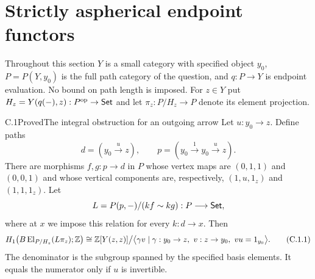 \section{Strictly aspherical endpoint functors}
\label{sec:C}

Throughout this section $Y$ is a small category with specified object
$y_0$, $P=P(Y,y_0)$ is the full path category of the question, and
$q:P\to Y$ is endpoint evaluation. No bound on path length is imposed.
For $z\in Y$ put $H_z=Y(q(-),z):P^{\mathrm{op}}\to\mathsf{Set}$ and let
$\pi_z:P/H_z\to P$ denote its element projection.

\begin{claim}{C.1}{Proved}{The integral obstruction for an outgoing arrow}
\label{C:outgoing}
Let $u:y_0\to z$. Define paths
\[
 d=(y_0\xrightarrow{u}z),\qquad
 p=(y_0\xrightarrow{1}y_0\xrightarrow{u}z).
\]
There are morphisms $f,g:p\to d$ in $P$ whose vertex maps are
$(0,1,1)$ and $(0,0,1)$ and whose vertical components are, respectively,
$(1,u,1_z)$ and $(1,1,1_z)$. Let
\[
 L=P(p,-)/(kf\sim kg):P\longrightarrow\mathsf{Set},
\]
where at $x$ we impose this relation for every $k:d\to x$. Then
\[
 H_1\bigl(B\operatorname{El}_{P/H_z}(L\pi_z);\mathbb Z\bigr)
 \cong \mathbb Z[Y(z,z)]\big/
 \big\langle\gamma v\mid
 \gamma:y_0\to z,\ v:z\to y_0,\ vu=1_{y_0}\big\rangle.
 \tag{C.1.1}\label{eq:C-outgoing}
\]
The denominator is the subgroup spanned by the specified basis elements.
It equals the numerator only if $u$ is invertible.
\end{claim}
